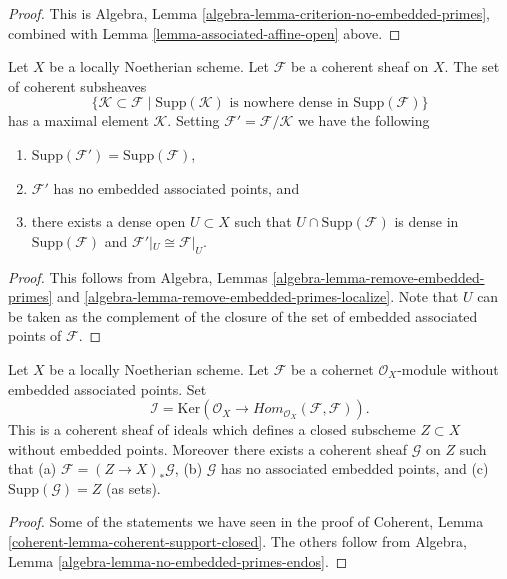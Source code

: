 \begin{proof}
This is Algebra, Lemma \ref{algebra-lemma-criterion-no-embedded-primes},
combined with Lemma \ref{lemma-associated-affine-open} above.
\end{proof}

\begin{lemma}
\label{lemma-remove-embedded-points}
Let $X$ be a locally Noetherian scheme.
Let $\mathcal{F}$ be a coherent sheaf on $X$.
The set of coherent subsheaves
$$
\{
\mathcal{K} \subset \mathcal{F}
\mid
\text{Supp}(\mathcal{K})\text{ is nowhere dense in }\text{Supp}(\mathcal{F})
\}
$$
has a maximal element $\mathcal{K}$.
Setting $\mathcal{F}' = \mathcal{F}/\mathcal{K}$ we have the
following
\begin{enumerate}
\item $\text{Supp}(\mathcal{F}') = \text{Supp}(\mathcal{F})$,
\item $\mathcal{F}'$ has no embedded associated points, and
\item there exists a dense open $U \subset X$ such that
$U \cap \text{Supp}(\mathcal{F})$ is dense in $\text{Supp}(\mathcal{F})$
and $\mathcal{F}'|_U \cong \mathcal{F}|_U$.
\end{enumerate}
\end{lemma}

\begin{proof}
This follows from
Algebra, Lemmas \ref{algebra-lemma-remove-embedded-primes} and
\ref{algebra-lemma-remove-embedded-primes-localize}.
Note that $U$ can be taken as the complement of the closure
of the set of embedded associated points of $\mathcal{F}$.
\end{proof}

\begin{lemma}
\label{lemma-no-embedded-points-endos}
Let $X$ be a locally Noetherian scheme.
Let $\mathcal{F}$ be a cohernet $\mathcal{O}_X$-module
without embedded associated points. Set
$$
\mathcal{I}
=
\text{Ker}(\mathcal{O}_X
\longrightarrow
\textit{Hom}_{\mathcal{O}_X}(\mathcal{F}, \mathcal{F})).
$$
This is a coherent sheaf of ideals which defines a closed
subscheme $Z \subset X$ without embedded points. Moreover
there exists a coherent sheaf $\mathcal{G}$ on $Z$
such that (a) $\mathcal{F} = (Z \to X)_*\mathcal{G}$,
(b) $\mathcal{G}$ has no associated embedded points, and
(c) $\text{Supp}(\mathcal{G}) = Z$ (as sets).
\end{lemma}

\begin{proof}
Some of the statements we have seen in the proof of
Coherent, Lemma \ref{coherent-lemma-coherent-support-closed}.
The others follow from
Algebra, Lemma \ref{algebra-lemma-no-embedded-primes-endos}.
\end{proof}





